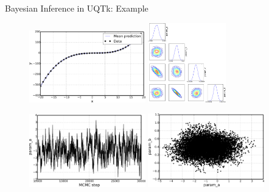 \documentclass[10pt]{beamer}
\begin{document}
\begin{frame}{Bayesian Inference in UQTk: Example}
     \begin{figure}
         \includegraphics[width=0.45\textwidth]{result}
         \hspace{0.5in}
         \includegraphics[width=0.3\textwidth]{posteriorSummary}
         \hspace{0.4in}
     \end{figure}
     \begin{figure}
         \includegraphics[width=0.45\textwidth]{chainExample}
         \hspace{0.1in}
         \includegraphics[width=0.45\textwidth]{chain2DExample}
     \end{figure}
\end{frame}
\end{document}

